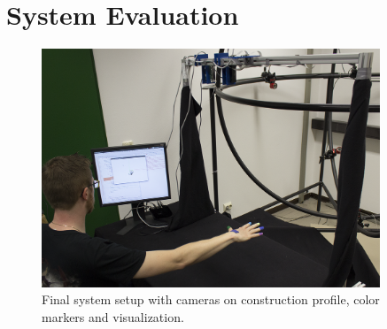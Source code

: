 \chapter{System Evaluation}
\begin{figure}[H]
\centering
\includegraphics[width=0.9\textwidth]{images/complete_setup.png}
\caption{Final system setup with cameras on construction profile, color markers and visualization.}
\label{img:complete_setup} 
\end{figure}

